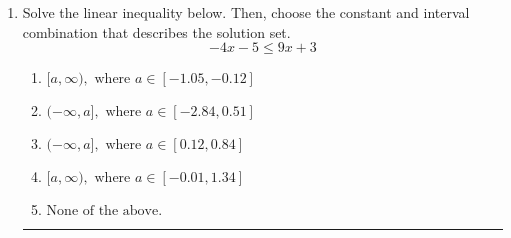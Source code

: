 \documentclass[14pt]{extbook}
\newcommand{\litem}[1]{\item#1\hspace*{-1cm}\rule{\textwidth}{0.4pt}}
\begin{document}
\begin{enumerate}
{\begin{enumerate}[label=\Alph*.]
\end{enumerate} }
\litem{
Solve the linear inequality below. Then, choose the constant and interval combination that describes the solution set.\[ -4x -5 \leq 9x + 3 \]\begin{enumerate}[label=\Alph*.]
\item \( [a, \infty), \text{ where } a \in [-1.05, -0.12] \)
\item \( (-\infty, a], \text{ where } a \in [-2.84, 0.51] \)
\item \( (-\infty, a], \text{ where } a \in [0.12, 0.84] \)
\item \( [a, \infty), \text{ where } a \in [-0.01, 1.34] \)
\item \( \text{None of the above}. \)

\end{enumerate} }
\end{enumerate}
\end{document}
